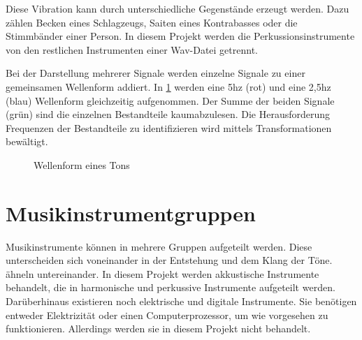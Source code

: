 Diese Vibration kann durch unterschiedliche Gegenstände erzeugt werden. Dazu zählen Becken eines Schlagzeugs, Saiten eines Kontrabasses oder die Stimmbänder einer Person. In diesem Projekt werden die Perkussionsinstrumente von den restlichen Instrumenten einer Wav-Datei getrennt.

\par

Bei der Darstellung mehrerer Signale werden einzelne Signale zu einer gemeinsamen Wellenform addiert. In \cref{wav_multiple_sounds} werden eine 5hz (rot) und eine 2,5hz (blau) Wellenform gleichzeitig aufgenommen. Der Summe der beiden Signale (grün) sind die einzelnen Bestandteile kaumabzulesen. Die Herausforderung Frequenzen der Bestandteile zu identifizieren wird mittels Transformationen bewältigt.

%
\begin{figure}[h]
    \centering
    \caption{Wellenform eines Tons}
    \label{wav_multiple_sounds}
\end{figure}
%

%
\section{Musikinstrumentgruppen}
\label{instrument_groups}
%

Musikinstrumente können in mehrere Gruppen aufgeteilt werden. Diese unterscheiden sich voneinander in der Entstehung und dem Klang der Töne. ähneln untereinander. In diesem Projekt werden akkustische Instrumente behandelt, die in harmonische und perkussive Instrumente aufgeteilt werden. Darüberhinaus existieren noch elektrische und digitale Instrumente. Sie benötigen entweder Elektrizität oder einen Computerprozessor, um wie vorgesehen zu funktionieren. Allerdings werden sie in diesem Projekt nicht behandelt.

